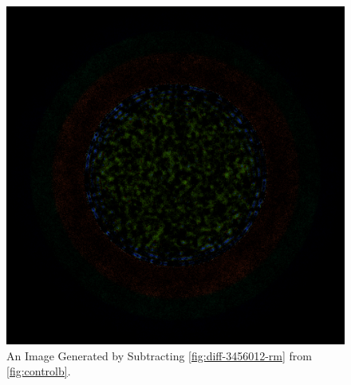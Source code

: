 \begin{figure}[H]
\centering
\includegraphics[width=0.6\linewidth]{figures/shuffle/diff-3456012}
\caption{An Image Generated by Subtracting \ref{fig:diff-3456012-rm} from \ref{fig:controlb}.}
\label{fig:diff-3456012}
\end{figure}
